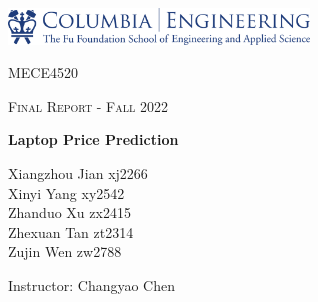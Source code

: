 \documentclass{scrartcl}
\begin{document}
\begin{titlepage}
	\centering
	\includegraphics[width=0.6\textwidth]{Graphics/CU E LOGO.png}\par
	\vspace{1cm}
	{\scshape\LARGE MECE4520 \par}      
 
	\vspace{1cm}
	{\scshape\Large Final Report - Fall 2022\par}
	\vfill
	
	{\huge\bfseries Laptop Price Prediction\par}
	\vfill
	
	{\Large Xiangzhou Jian xj2266\\Xinyi Yang xy2542\\Zhanduo Xu zx2415\\Zhexuan Tan zt2314\\Zujin Wen zw2788\\}\par
	\vspace{1.5cm}

	\vfill
	{\Large Instructor: Changyao Chen}\par



	\vfill
\end{titlepage}


\newpage



\doublespacing
\tableofcontents
\singlespacing

\newpage

\doublespacing



\end{document}
